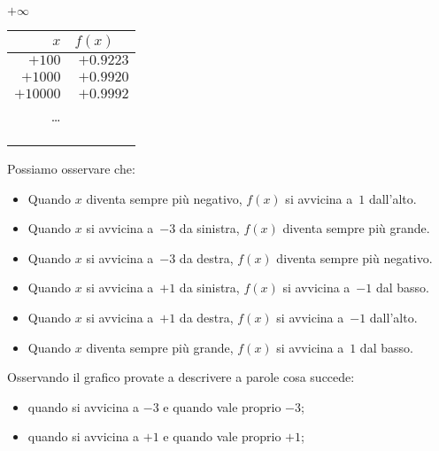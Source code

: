 \begin{esempio}
\begin{minipage}{.24\textwidth}
\begin{center}
\end{center}
\end{minipage}
\begin{minipage}{.24\textwidth}
\begin{center}
\(+\infty\)\\
\begin{tabular}{r|r}
\(x\) & \(f(x)\quad\)\\\hline
\(+100\) & \(+0.9223\) \\
\(+1000\) & \(+0.9920\) \\
\(+10000\) & \(+0.9992\) \\
\dots \\
&\\
&\\
&
\end{tabular}
\end{center}
\end{minipage}

\vspace{1em}
Possiamo osservare che:
\begin{itemize} [nosep]
 \item Quando \(x\) diventa sempre più negativo, 
\(f(x)\) si avvicina a~\(1\) dall'alto.
 \item Quando \(x\) si avvicina a~\(-3\) da sinistra, 
\(f(x)\) diventa sempre più grande.
 \item Quando \(x\) si avvicina a~\(-3\) da destra, 
\(f(x)\) diventa sempre più negativo.
 \item Quando \(x\) si avvicina a~\(+1\) da sinistra, 
\(f(x)\)  si avvicina a~\(-1\) dal basso.
 \item Quando \(x\) si avvicina a~\(+1\) da destra, 
\(f(x)\)  si avvicina a~\(-1\) dall'alto.
 \item Quando \(x\) diventa sempre più grande, 
\(f(x)\) si avvicina a~\(1\) dal basso.
\end{itemize}
\begin{center}\scalebox{.6}{\limitigraficoa}\end{center}
\end{esempio}

Osservando il grafico provate a descrivere a parole cosa succede:

\begin{itemize} [nosep]
 \item quando si avvicina a \(-3\) e quando vale proprio \(-3\);
 \item quando si avvicina a \(+1\) e quando vale proprio \(+1\); 
\end{itemize}

